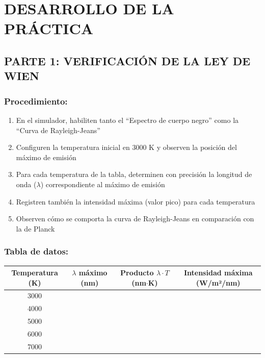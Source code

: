 \documentclass[12pt,a4paper]{article}
\begin{document}
	
	\section{DESARROLLO DE LA PRÁCTICA}
	
	
	\subsection{PARTE 1: VERIFICACIÓN DE LA LEY DE WIEN}
	
	\subsubsection{Procedimiento:}
	\begin{enumerate}
		\item En el simulador, habiliten tanto el ``Espectro de cuerpo negro'' como la ``Curva de Rayleigh-Jeans''
		\item Configuren la temperatura inicial en 3000 K y observen la posición del máximo de emisión
		\item Para cada temperatura de la tabla, determinen con precisión la longitud de onda ($\lambda$) correspondiente al máximo de emisión
		\item Registren también la intensidad máxima (valor pico) para cada temperatura
		\item Observen cómo se comporta la curva de Rayleigh-Jeans en comparación con la de Planck
	\end{enumerate}
	
	\subsubsection{Tabla de datos:}
	
	\begin{center}
		\begin{tabular}{|c|c|c|c|}
			\hline
			\textbf{Temperatura (K)} & \textbf{$\lambda$ máximo (nm)} & \textbf{Producto $\lambda \cdot T$ (nm$\cdot$K)} & \textbf{Intensidad máxima (W/m²/nm)} \\
			\hline
			3000 & & & \\
			\hline
			4000 & & & \\
			\hline
			5000 & & & \\
			\hline
			6000 & & & \\
			\hline
			7000 & & & \\
			\hline
		\end{tabular}
	\end{center}
	
\end{document}
